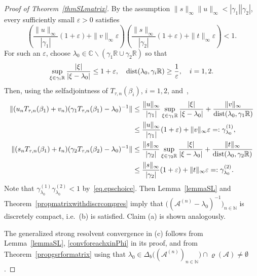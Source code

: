 \documentclass[a4paper,reqno]{amsart}
\begin{document}
\begin{proof}[Proof of Theorem~{\rm\ref{thmSLmatrix}}]
By the assumption $\|s\|_{\infty}\|u\|_{\infty}<|\gamma_1| |\gamma_2|$,
every sufficiently small $\varepsilon>0$ satisfies
\begin{equation}\label{eq.epschoice}
\left(\frac{\|u\|_{\infty}}{|\gamma_1|}(1+\varepsilon)+\|v\|_{\infty}\varepsilon\right)\left(\frac{\|s\|_{\infty}}{|\gamma_2|}(1+\varepsilon)+\|t\|_{\infty}\varepsilon\right)<1.
\end{equation}
For such an $\varepsilon$, choose $\lambda_0\in{\mathbb{C}}\backslash (\gamma_1 {\mathbb{R}}\cup\gamma_2{\mathbb{R}})$ so that
$$\sup_{\xi\in\gamma_i{\mathbb{R}}}\frac{|\xi|}{|\xi-\lambda_0|}\leq 1+\varepsilon, \quad {\rm dist}(\lambda_0,\gamma_i{\mathbb{R}})\geq \frac{1}\varepsilon,\quad i=1,2.$$
Then, using the selfadjointness of $T_{\tau,n}(\beta_i)$, $i=1,2$, and~\cite[Equation~V.(3.17)]{kato}, 
\begin{align*}
\|(u_nT_{\tau,n}(\beta_1)+v_n)(\gamma_1 T_{\tau,n}(\beta_1)-\lambda_0)^{-1}\|&\leq \frac{\|u\|_{\infty}}{|\gamma_1|}\sup_{\xi\in\gamma_1{\mathbb{R}}}\frac{|\xi|}{|\xi-\lambda_0|}+\frac{\|v\|_{\infty}}{{\rm dist}(\lambda_0,\gamma_1{\mathbb{R}})}\\
&\leq \frac{\|u\|_{\infty}}{|\gamma_1|}(1+\varepsilon)+\|v\|_{\infty}\varepsilon=:\gamma_{\lambda_0}^{(1)},\\
\|(s_nT_{\tau,n}(\beta_1)+t_n)(\gamma_2 T_{\tau,n}(\beta_2)-\lambda_0)^{-1}\|&\leq \frac{\|s\|_{\infty}}{|\gamma_2|}\sup_{\xi\in\gamma_2{\mathbb{R}}}\frac{|\xi|}{|\xi-\lambda_0|}+\frac{\|t\|_{\infty}}{{\rm dist}(\lambda_0,\gamma_2{\mathbb{R}})}\\
&\leq \frac{\|s\|_{\infty}}{|\gamma_2|}(1+\varepsilon)+\|t\|_{\infty}\varepsilon=:\gamma_{\lambda_0}^{(2)}.
\end{align*}
Note that $\gamma_{\lambda_0}^{(1)} \gamma_{\lambda_0}^{(2)}<1$ by~\eqref{eq.epschoice}.
Then Lemma~\ref{lemmaSL} and Theorem~\ref{propmatrixwithdiscrcompres}  imply that $\big(({\mathcal A}^{(n)}-\lambda_0)^{-1}\big)_{n\in{\mathbb{N}}}$ is discretely compact, i.e.\ (b) is satisfied. 
Claim (a) is shown analogously.

The generalized strong resolvent convergence in (c) follows from Lemma~\ref{lemmaSL}, \eqref{convforeachxinPhi} in its proof, and from Theorem~\ref{propgsrformatrix} using  that $\lambda_0\in\Delta_b\big(({\mathcal A}^{(n)})_{n\in{\mathbb{N}}}\big)\cap\varrho({\mathcal A})\neq\emptyset$. 


\end{proof}
\end{document}
